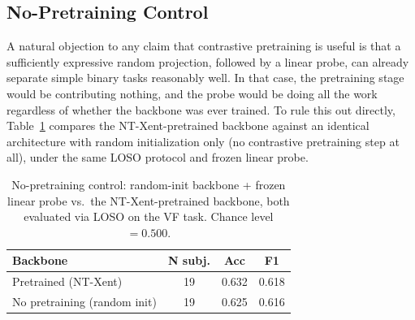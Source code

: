 \documentclass[journal]{IEEEtran}
\begin{document}
\subsection{No-Pretraining Control}
A natural objection to any claim that contrastive pretraining is useful is that a sufficiently expressive random projection, followed by a linear probe, can already separate simple binary tasks reasonably well. In that case, the pretraining stage would be contributing nothing, and the probe would be doing all the work regardless of whether the backbone was ever trained. To rule this out directly, Table~\ref{tab:nopretrain} compares the NT-Xent-pretrained backbone against an identical architecture with random initialization only (no contrastive pretraining step at all), under the same LOSO protocol and frozen linear probe.

\begin{table}[t]
\centering
\caption{No-pretraining control: random-init backbone + frozen linear probe vs.\ the NT-Xent-pretrained backbone, both evaluated via LOSO on the VF task. Chance level $=0.500$.}
\label{tab:nopretrain}
\footnotesize
\begin{tabular}{l c c c}
\toprule
Backbone & N subj. & Acc & F1 \\
\midrule
Pretrained (NT-Xent) & 19 & 0.632 & 0.618 \\
No pretraining (random init) & 19 & 0.625 & 0.616 \\
\bottomrule
\end{tabular}
\end{table}
\end{document}
